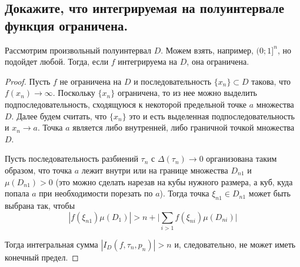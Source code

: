 
\subsection{Докажите, что интегрируемая на полуинтервале функция ограничена.}

\begin{theorem}
    Рассмотрим произвольный полуинтервал $D$. Можем взять, например, $(0;1]^n$, но подойдет любой. Тогда, если $f$ интегрируема на $D$, она ограничена.
\end{theorem}

\begin{proof}
    Пусть $f$ не ограничена на $D$ и последовательность $\{x_n\} \subset D$ такова, что $f(x_n) \to \infty$.
    Поскольку $\{x_n\}$ ограничена, то из нее можно выделить подпоследовательность, сходящуюся к некоторой предельной точке $a$ множества $D$.
    Далее будем считать, что $\{x_n\}$ это и есть выделенная подпоследовательность и $x_n \to a$.
    Точка $a$ является либо внутренней, либо граничной точкой множества $D$.
    
    Пусть последовательность разбиений $\tau_n$ с $\Delta (\tau_n) \to 0$ организована таким образом, что точка $a$ лежит внутри или на границе множества $D_{n1}$ и $\mu(D_{n1}) > 0$ (это можно сделать нарезав на кубы нужного размера, а куб, куда попала $a$ при необходимости порезать по $a$).
    Тогда точка $\xi_{n1} \in D_{n1}$ может быть выбрана так, чтобы
    \begin{equation*}
        |f(\xi_{n1}) \mu(D_1)| > n + \bigg| \sum\limits_{i > 1} f(\xi_{ni}) \mu(D_{ni}) \bigg|
    \end{equation*}
    
    Тогда интегральная сумма $|I_D(f, \tau_n, p_n)| > n$ и, следовательно, не может иметь конечный предел.
\end{proof}

